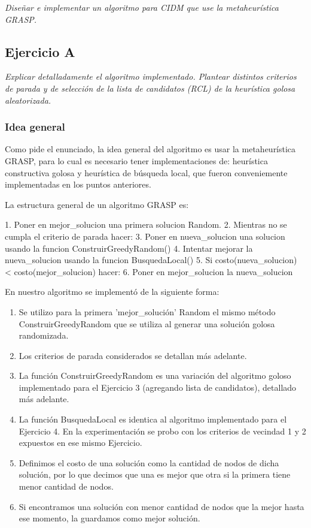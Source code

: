 \textit{Diseñar e implementar un algoritmo para CIDM que use la metaheurística GRASP.}

\subsection{Ejercicio A}

\textit{Explicar detalladamente el algoritmo implementado. Plantear distintos criterios de parada y de selección de la lista de candidatos (RCL) de la heurística golosa aleatorizada.}

\medskip

\subsubsection{Idea general}

Como pide el enunciado, la idea general del algoritmo es usar la metaheurística GRASP, para lo cual es necesario tener implementaciones de: heurística constructiva golosa y heurística de búsqueda local, que fueron conveniemente implementadas en los puntos anteriores.

La estructura general de un algoritmo GRASP es:

\begin{codesnippet}
1. Poner en mejor_solucion una primera solucion Random.
2. Mientras no se cumpla el criterio de parada hacer:
3.     Poner en nueva_solucion una solucion usando la funcion ConstruirGreedyRandom()
4.     Intentar mejorar la nueva_solucion usando la funcion BusquedaLocal()
5.     Si costo(nueva_solucion) < costo(mejor_solucion) hacer:
6.         Poner en mejor_solucion la nueva_solucion
\end{codesnippet}

En nuestro algoritmo se implementó de la siguiente forma:
\begin{enumerate}
    \item Se utilizo para la primera 'mejor_solución' Random el mismo método ConstruirGreedyRandom que se utiliza al generar una solución golosa randomizada.
    \item Los criterios de parada considerados se detallan más adelante.
    \item La función ConstruirGreedyRandom es una variación del algoritmo goloso implementado para el Ejercicio 3 (agregando lista de candidatos), detallado más adelante.
    \item La función BusquedaLocal es identica al algoritmo implementado para el Ejercicio 4. En la experimentación se probo con los criterios de vecindad 1 y 2 expuestos en ese mismo Ejercicio.
    \item Definimos el costo de una solución como la cantidad de nodos de dicha solución, por lo que decimos que una es mejor que otra si la primera tiene menor cantidad de nodos.
    \item Si encontramos una solución con menor cantidad de nodos que la mejor hasta ese momento, la guardamos como mejor solución.
\end{enumerate}

